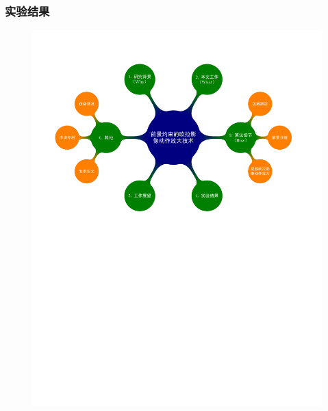 \documentclass[xcolor=svgnames,serif,table,10pt]{beamer}
\begin{document}
\begin{frame}
  \frametitle{实验结果}
  \vspace{-2.5em}
  \begin{figure}
    \centering
    \includegraphics[width=\textwidth, page=8]{mindmap.pdf}
  \end{figure}
\end{frame}
\end{document}
